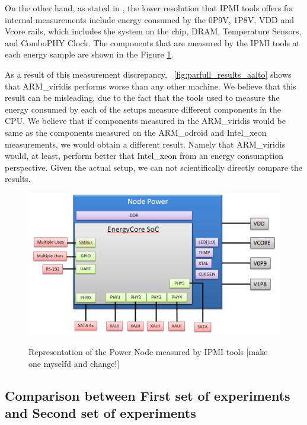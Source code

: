 On the other hand, as stated in \cite{IPMI_resolution}, the lower resolution that IPMI tools offers for internal measurements include energy consumed by the 0P9V, 1P8V, VDD and Vcore rails, which includes the system on the chip, DRAM, Temperature Sensors, and ComboPHY Clock. The components that are measured by the IPMI tools at each energy sample are shown in the Figure \ref{fig:power_node_ipmitool}.

As a result of this measurement discrepancy, ~\ref{fig:parfull_results_aalto} shows that ARM\_viridis performs worse than any other machine. We believe that this result can be misleading, due to the fact that the tools used to measure the energy consumed by each of the setups measure different components in the CPU. We believe that if components measured in the ARM\_viridis would be same as the components measured on the ARM\_odroid and Intel\_xeon measurements, we would obtain a different result. Namely that ARM\_viridis would, at least, perform better that Intel\_xeon from an energy consumption perspective. Given the actual setup, we can not scientifically directly compare the results.

\begin{figure}[h!]
  \centering
    \includegraphics[width=150mm]{"img/aalto/power_node_ipmitool"}
    \label{fig:power_node_ipmitool}
    \caption{Representation of the Power Node measured by IPMI tools [make one myselfd and change!]}
\end{figure}


\subsection*{Comparison between First set of experiments and Second set of experiments}

